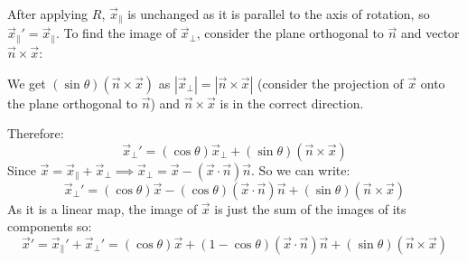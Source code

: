 \documentclass[../main.tex]{subfiles}
\begin{document}
After applying $R$, $\vec{x}_{\parallel}$ is unchanged as it is parallel to the axis of rotation, so $\vec{x}_{\parallel}' = \vec{x}_{\parallel}$.
To find the image of $\vec{x}_{\perp}$, consider the plane orthogonal to $\vec{n}$ and vector $\vec{n} \times \vec{x}$:
\begin{center}
\end{center}
We get $(\sin \theta)(\vec{n} \times \vec{x})$ as $|\vec{x}_{\perp}| = |\vec{n} \times \vec{x}|$ (consider the projection of $\vec{x}$ onto the plane orthogonal to $\vec{n}$) and $\vec{n} \times \vec{x}$ is in the correct direction.

Therefore:
\[
  \vec{x}_{\perp}' = (\cos \theta)\vec{x}_{\perp} + (\sin \theta)(\vec{n} \times \vec{x})
\]
Since $\vec{x} = \vec{x}_{\parallel} + \vec{x}_{\perp} \implies \vec{x}_{\perp} = \vec{x} - (\vec{x} \cdot \vec{n})\vec{n}$.
So we can write:
\[
  \vec{x}_{\perp}' = (\cos \theta)\vec{x} - (\cos \theta)(\vec{x} \cdot \vec{n})\vec{n} + (\sin \theta)(\vec{n} \times \vec{x})
\]
As it is a linear map, the image of $\vec{x}$ is just the sum of the images of its components so:
\[
  \vec{x}' = \vec{x}_{\parallel}' + \vec{x}_{\perp}' = (\cos \theta)\vec{x} + (1 - \cos\theta)(\vec{x} \cdot \vec{n})\vec{n} + (\sin \theta)(\vec{n} \times \vec{x})
\]
\end{document}
